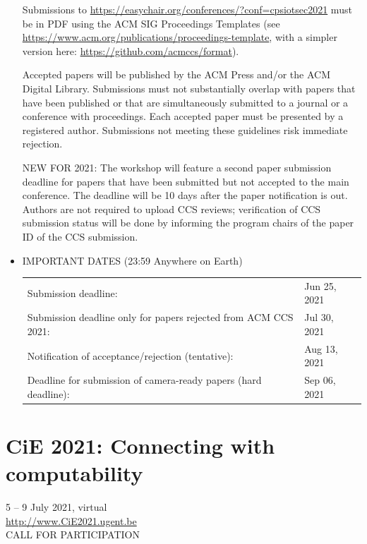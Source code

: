 \documentclass[prodmode,acmtecs]{acmsmall} %
\begin{document}
\begin{itemize}
  Submissions to \href{https://easychair.org/conferences/?conf=cpsiotsec2021}{https://easychair.org/conferences/?conf=cpsiotsec2021} must be in PDF using the ACM SIG Proceedings Templates (see \href{https://www.acm.org/publications/proceedings-template}{https://www.acm.org/publications/proceedings-template}, with a simpler version here: \href{https://github.com/acmccs/format}{https://github.com/acmccs/format}). 
 
  Accepted papers will be published by the ACM Press and/or the ACM Digital Library. Submissions must not substantially overlap with papers that have been published or that are simultaneously submitted to a journal or a conference with proceedings. Each accepted paper must be presented by a registered author. Submissions not meeting these guidelines risk immediate rejection. 
 
  NEW FOR 2021: The workshop will feature a second paper submission deadline for papers that have been submitted but not accepted to the main conference. The deadline will be 10 days after the paper notification is out. Authors are not required to upload CCS reviews; verification of CCS submission status will be done by informing the program chairs of the paper ID of the CCS submission. 
 
\item  IMPORTANT DATES (23:59 Anywhere on Earth) 
 
\begin{tabulary}{\linewidth}{LL}Submission deadline:  & Jun 25, 2021 \\
Submission deadline only for papers rejected from ACM CCS 2021:  & Jul 30, 2021 \\
Notification of acceptance/rejection (tentative):  & Aug 13, 2021 \\
Deadline for submission of camera-ready papers (hard deadline):  & Sep 06, 2021 \\
\end{tabulary}
 
\end{itemize}\section{CiE 2021: Connecting with computability}\label{CiE2021}  5 – 9 July 2021,  virtual \\ 
  \href{http://www.CiE2021.ugent.be}{http://www.CiE2021.ugent.be}\\ 
CALL FOR PARTICIPATION 
\end{document}
